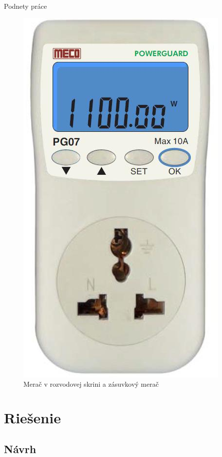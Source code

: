 \documentclass[hyperref={unicode}]{beamer}
\begin{document}
\begin{frame}{Podnety práce}
\begin{figure}[htp]
		\includegraphics[height=\myGraphicsHeight]{digital-plug-meter}
		\caption{Merač v rozvodovej skrini a zásuvkový merač}
	\end{figure}

\end{frame}



\section{Riešenie}
\label{sec:Riešenie}

\subsection{Návrh}
\label{sub:Návrh}
\end{document}
